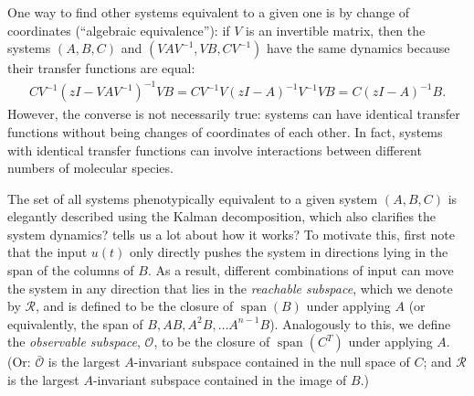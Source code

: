 \documentclass{article}
\newcommand{\plr}[1]{\todo[color=blue!25]{#1}}
\newcommand{\plr}[1]{{\color{blue}\it #1}}
\newcommand{\reachable}{\mathcal{R}}
\newcommand{\unobservable}{\bar{\mathcal{O}}}
\newcommand{\1}{\mathbbm{1}}
\DeclareMathOperator{\spn}{span}
\begin{document}
One way to find other systems equivalent to a given one
is by change of coordinates (``algebraic equivalence''):
if $V$ is an invertible matrix, then the systems $(A,B,C)$ and $(VAV^{-1},VB,CV^{-1})$
have the same dynamics because their transfer functions are equal:
\begin{align*}
    CV^{-1}( zI - VAV^{-1})^{-1}VB
    =
    CV^{-1}V( zI - A)^{-1}V^{-1}VB
    =
    C( zI - A)^{-1}B .
\end{align*}
However, the converse is not necessarily true: 
systems can have identical transfer functions without being changes of coordinates of each other.
In fact, systems with identical transfer functions can involve interactions between different
numbers of molecular species.

The set of all systems phenotypically equivalent to a given system $(A,B,C)$ 
is elegantly described using the Kalman decomposition,
which also clarifies the system dynamics? tells us a lot about how it works? \plr{or something}
To motivate this, first note that the input $u(t)$ only directly pushes the system
in directions lying in the span of the columns of $B$.
As a result, different combinations of input can 
move the system in any direction that lies in the \emph{reachable subspace},
which we denote by $\reachable$,
and is defined to be the closure of $\spn(B)$ under applying $A$
(or equivalently, the span of $B, AB, A^2B, \ldots A^{n-1}B$).
Analogously to this, we define
the \emph{observable subspace}, $\mathcal{O}$,
to be the closure of $\spn(C^T)$ under applying $A$.
(Or: $\unobservable$ is the largest $A$-invariant subspace
contained in the null space of $C$;
and $\reachable$ is the largest $A$-invariant subspace contained in the image of $B$.)
\end{document}
